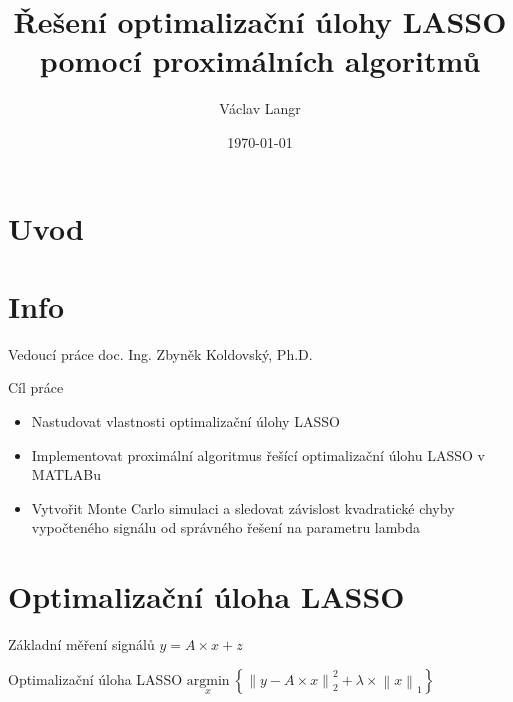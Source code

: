 


\title{Řešení optimalizační úlohy LASSO pomocí proximálních algoritmů}
%
\author{Václav Langr}
% 
\date{\today} %
\newcommand{\TextTitulniStranaPodLinkou}{\tiny
Studentská 2 {\color{FM_TUL} |} 461\,17 Liberec 2 {\color{FM_TUL} |} 
{vaclav.langr@tul.cz} {\color{FM_TUL} |} 
\href{http://www.fm.tul.cz/}{www.fm.tul.cz}}
 
\section{Uvod}
\begin{frame}[plain]
\titlepage
\end{frame}
\section{Info}
\begin{frame}
	\vfill
	\begin{block}{Vedoucí práce}
	    doc. Ing. Zbyněk Koldovský, Ph.D.
	\end{block}
	\begin{block}{Cíl práce}
    \begin{itemize}
        \item Nastudovat vlastnosti optimalizační úlohy LASSO
        \item Implementovat proximální algoritmus řešící optimalizační úlohu LASSO v MATLABu
        \item Vytvořit Monte Carlo simulaci a sledovat závislost kvadratické chyby vypočteného signálu od správného řešení na parametru lambda
      \end{itemize}
    \end{block}
\end{frame}
\section{Optimalizační úloha LASSO}
\vfill
\begin{frame}
	\vfill
	\begin{block}{Základní měření signálů}
	$y = A \times x + z$
	\end{block}
	\begin{block}{Optimalizační úloha LASSO}
		$\underset{x} {\mathrm{argmin}} ~\left\{\left\|y-A \times x\right\| ^2 _2+ \lambda \times \left\|x\right\|_1\right\}$
	\end{block}
\end{frame}
